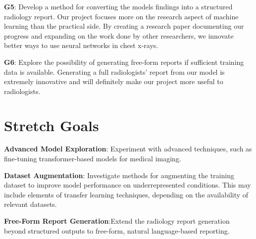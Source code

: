 \documentclass{article}
\begin{document}
\begin{itemize}
\begin{item}
    \textbf{G5}: Develop a method for converting the models findings into a structured radiology report. Our project focuses more on the research aspect of machine learning than the 
    practical side. By creating a research paper documenting our progress and expanding on the 
    work done by other researchers, we innovate better ways to use neural networks in chest 
    x-rays.
\end{item}
\begin{item}
    \textbf{G6}: Explore the possibility of generating free-form reports if sufficient training data is available. Generating a full radiologists' report from our model is extremely 
    innovative and will definitely make our project more useful to radiologists.
\end{item}
\end{itemize}

\section{Stretch Goals}

\begin{itemize}
\begin{item}
    \textbf{Advanced Model Exploration}: Experiment with advanced techniques, such as fine-tuning transformer-based models for medical imaging.
\end{item}
\begin{item} 
    \textbf{Dataset Augmentation}: Investigate methods for augmenting the training dataset to improve model performance on underrepresented conditions. This may include elements of transfer learning techniques, depending on the availability of relevant datasets.
\end{item}
\begin{item} 
    \textbf{Free-Form Report Generation}:Extend the radiology report generation beyond structured outputs to free-form, natural language-based reporting.
\end{item}
\end{itemize}
\end{document}
